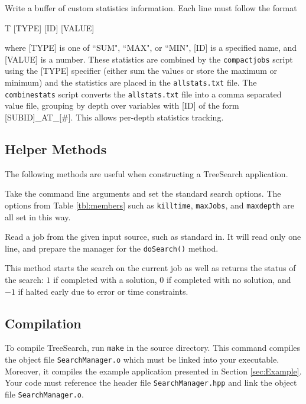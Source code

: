 \documentclass[11pt]{article}
\def\TreeSearch{{TreeSearch}}
\begin{document}
	
	Write a buffer of custom statistics information.
	Each line must follow the format
		\begin{center}
			T [TYPE] [ID] [VALUE]
		\end{center}
	where [TYPE] is one of ``SUM", ``MAX", or ``MIN",
		[ID] is a specified name,
		and [VALUE] is a number.
	These statistics are combined by the \texttt{compactjobs} script
		using the [TYPE] specifier (either sum the values or store the maximum or minimum)
		and the statistics are placed in the \texttt{allstats.txt} file.
	The \texttt{combinestats} script converts the \texttt{allstats.txt} file
		into a comma separated value file, grouping by depth over variables
		with [ID] of the form [SUBID]\_AT\_[\#].
	This allows per-depth statistics tracking.
	
	
\subsection{Helper Methods}

The following methods are useful when constructing a {\TreeSearch} application.

	Take the command line arguments and set the standard search options.
	The options from Table \ref{tbl:members} such as \texttt{killtime},
		\texttt{maxJobs}, and \texttt{maxdepth} are all set
		in this way.

	Read a job from the given input source, such as standard in.
	It will read only one line,
		and prepare the manager for the \texttt{doSearch()} method.
	
	This method starts the search on the current job
		as well as returns the status of the search:
		$1$ if completed with a solution,
		$0$ if completed with no solution,
		and $-1$ if halted early due to error or time constraints.
	

\subsection{Compilation}
\label{sec:Compilation}

To compile \TreeSearch, run \texttt{make} in the source directory.
This command compiles the object file \texttt{SearchManager.o} which must be
	linked into your executable.
Moreover, it compiles the example application presented in Section \ref{sec:Example}.
Your code must reference the header file \texttt{SearchManager.hpp}
	and link the object file \texttt{SearchManager.o}.
\end{document}
